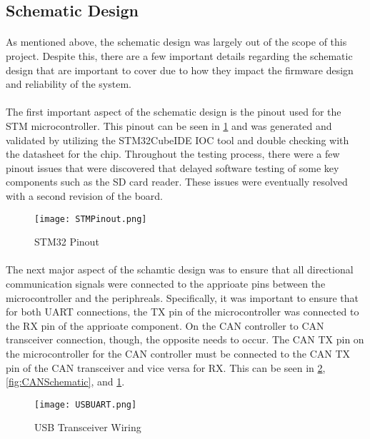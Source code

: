 \subsection{Schematic Design}

\paragraph{}
As mentioned above, the schematic design was largely out of the scope of this project.
Despite this, there are a few important details regarding the schematic design that are important to cover due to how they impact the firmware design and reliability of the system.

\paragraph{}
The first important aspect of the schematic design is the pinout used for the STM microcontroller.
This pinout can be seen in \cref{fig:STMIOC} and was generated and validated by utilizing the STM32CubeIDE IOC tool and double checking with the datasheet for the chip.
Throughout the testing process, there were a few pinout issues that were discovered that delayed software testing of some key components such as the SD card reader.
These issues were eventually resolved with a second revision of the board.

\begin{figure}[H]
	\centering
	\texttt{[image: STMPinout.png]}
	\caption{STM32 Pinout}
	\label{fig:STMIOC}
\end{figure}

\paragraph{}
The next major aspect of the schamtic design was to ensure that all directional communication signals were connected to the apprioate pins between the microcontroller and the periphreals.
Specifically, it was important to ensure that for both UART connections, the TX pin of the microcontroller was connected to the RX pin of the apprioate component.
On the CAN controller to CAN transceiver connection, though, the opposite needs to occur.
The CAN TX pin on the microcontroller for the CAN controller must be connected to the CAN TX pin of the CAN transceiver and vice versa for RX.
This can be seen in \cref{fig:USBSchematic}, \cref{fig:CANSchematic}, and \cref{fig:STMIOC}.


\begin{figure}[H]
	\centering
	\texttt{[image: USBUART.png]}
	\caption{USB Transceiver Wiring}
	\label{fig:USBSchematic}
\end{figure}

